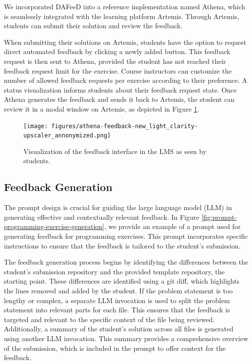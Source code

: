 \documentclass[manuscript,screen,review]{acmart}
\begin{document}
We incorporated DAFeeD into a reference implementation named Athena, which is seamlessly integrated with the learning platform Artemis. 
Through Artemis, students can submit their solution and review the feedback.

When submitting their solutions on Artemis, students have the option to request direct automated feedback by clicking a newly added button.
This feedback request is then sent to Athena, provided the student has not reached their feedback request limit for the exercise.
Course instructors can customize the number of allowed feedback requests per exercise according to their preference.
A status visualization informs students about their feedback request state.
Once Athena generates the feedback and sends it back to Artemis, the student can review it in a modal window on Artemis, as depicted in Figure \ref{fig:Artemis-feedback-visualization}.

\begin{figure}[htbp]
  \centering
  \texttt{[image: figures/athena-feedback-new\_light\_clarity-upscaler\_annonymized.png]}
  \caption{Visualization of the feedback interface in the LMS as seen by students.}
  \label{fig:Artemis-feedback-visualization}
\end{figure}


\subsection{Feedback Generation}

The prompt design is crucial for guiding the large language model (LLM) in generating effective and contextually relevant feedback. 
In Figure \ref{fig:prompt-programming-exercise-generation}, we provide an example of a prompt used for generating feedback for programming exercises. 
This prompt incorporates specific instructions to ensure that the feedback is tailored to the student's submission.

The feedback generation process begins by identifying the differences between the student's submission repository and the provided template repository, the starting point. 
These differences are identified using a git diff, which highlights the lines removed and added by the student. 
If the problem statement is too lengthy or complex, a separate LLM invocation is used to split the problem statement into relevant parts for each file. 
This ensures that the feedback is targeted and relevant to the specific context of the file being reviewed. 
Additionally, a summary of the student's solution across all files is generated using another LLM invocation. 
This summary provides a comprehensive overview of the submission, which is included in the prompt to offer context for the feedback.
\end{document}
